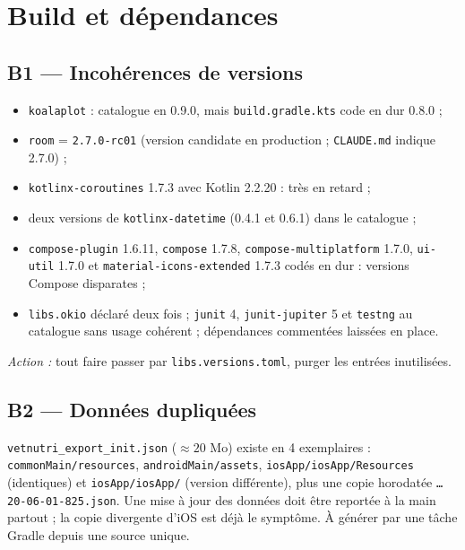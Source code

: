 \documentclass[11pt,a4paper]{article}
\newcommand{\code}[1]{\texttt{#1}}
\newcommand{\prio}[1]{\textbf{\textcolor{#1}{\textbullet}}}
\begin{document}
\section{Build et dépendances}
\subsection*{\prio{red!80!black} B1 --- Incohérences de versions}
\begin{itemize}
  \item \code{koalaplot} : catalogue en 0.9.0, mais \code{build.gradle.kts} code en dur 0.8.0 ;
  \item \code{room} = \code{2.7.0-rc01} (version candidate en production ; \code{CLAUDE.md} indique 2.7.0) ;
  \item \code{kotlinx-coroutines} 1.7.3 avec Kotlin 2.2.20 : très en retard ;
  \item deux versions de \code{kotlinx-datetime} (0.4.1 et 0.6.1) dans le catalogue ;
  \item \code{compose-plugin} 1.6.11, \code{compose} 1.7.8, \code{compose-multiplatform} 1.7.0,
        \code{ui-util} 1.7.0 et \code{material-icons-extended} 1.7.3 codés en dur : versions Compose disparates ;
  \item \code{libs.okio} déclaré deux fois ; \code{junit} 4, \code{junit-jupiter} 5 et \code{testng} au catalogue
        sans usage cohérent ; dépendances commentées laissées en place.
\end{itemize}
\emph{Action :} tout faire passer par \code{libs.versions.toml}, purger les entrées inutilisées.

\subsection*{\prio{orange} B2 --- Données dupliquées}
\code{vetnutri\_export\_init.json} (\(\approx 20\) Mo) existe en 4 exemplaires :
\code{commonMain/resources}, \code{androidMain/assets}, \code{iosApp/iosApp/Resources}
(identiques) et \code{iosApp/iosApp/} (version différente), plus une copie horodatée
\code{\dots 20-06-01-825.json}. Une mise à jour des données doit être reportée à la main
partout ; la copie divergente d'iOS est déjà le symptôme. À générer par une tâche Gradle
depuis une source unique.
\end{document}
